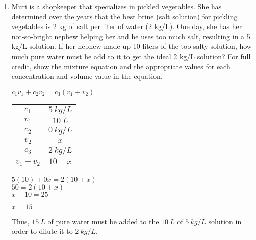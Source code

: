 \documentclass[letterpaper,12pt,fleqn]{article}
\begin{document}
\begin{enumerate}
\item Muri is a shopkeeper that specializes in pickled vegetables. She has
  determined over the years that the best brine (salt solution) for pickling
  vegetables is 2 kg of salt per liter of water (2 kg/L).  One day, she has her
  not-so-bright nephew helping her and he uses too much salt, resulting in
  a 5 kg/L solution.  If her nephew made up 10 liters of the too-salty solution,
  how much pure water must he add to it to get the ideal 2 kg/L solution? For
  full credit, show the mixture equation and the appropriate values for each
  concentration and volume value in the equation.

  \bigskip

  $c_1v_1+c_2v_2=c_3(v_1+v_2)$

  \begin{tabular}{cc}
    $c_1$ & $\SI{5}{kg/L}$ \\
    $v_1$ & $\SI{10}{L}$ \\
    $c_2$ & $\SI{0}{kg/L}$ \\
    $v_2$ & $x$ \\
    $c_3$ & $\SI{2}{kg/L}$ \\
    $v_1+v_2$ & $10+x$
  \end{tabular}

  $5(10)+0x=2(10+x)$ \\
  $50=2(10+x)$ \\
  $x+10=25$
  
  $x=15$

  Thus, $\SI{15}{L}$ of pure water must be added to the $\SI{10}{L}$ of
  $\SI{5}{kg/L}$ solution in order to dilute it to $\SI{2}{kg/L}$.
\end{enumerate}
\end{document}
